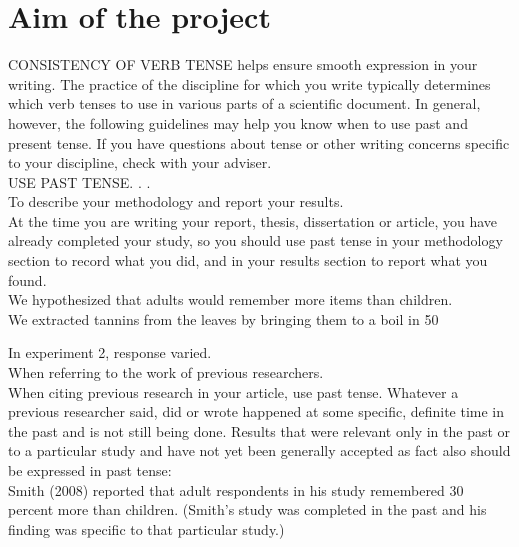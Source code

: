 \section{Aim of the project}
\label{sec:aim}




\newpage

CONSISTENCY OF VERB TENSE helps ensure smooth expression in your writing. The practice of the discipline for which you write typically determines which verb tenses to use in various parts of a scientific document. In general, however, the following guidelines may help you know when to use past and present tense. If you have questions about tense or other writing concerns specific to your discipline, check with your adviser.\\

USE PAST TENSE. . .\\

To describe your methodology and report your results.\\

At the time you are writing your report, thesis, dissertation or article, you have already completed your study, so you should use past tense in your methodology section to record what you did, and in your results section to report what you found.\\

       We hypothesized that adults would remember more items than children.\\

       We extracted tannins from the leaves by bringing them to a boil in 50%

       In experiment 2, response varied.\\

When referring to the work of previous researchers.\\

When citing previous research in your article, use past tense. Whatever a previous researcher said, did or wrote happened at some specific, definite time in the past and is not still being done. Results that were relevant only in the past or to a particular study and have not yet been generally accepted as fact also should be expressed in past tense:\\

Smith (2008) reported that adult respondents in his study remembered 30 percent more than children. (Smith's study was completed in the past and his finding was specific to that particular study.)\\

